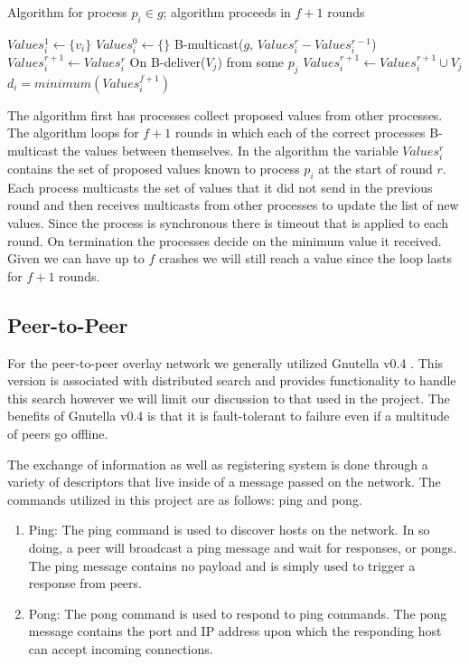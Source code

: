 \documentclass[10pt,letterpaper]{article}
\begin{document}
\begin{algorithm}
\caption{Algorithm for process $p_i \in g$; algorithm proceeds in $f+1$ rounds  }\label{alg:cap}
\begin{algorithmic}
\State $Values_i^1 \gets \{v_i\}$
\State $Values_i^0 \gets \{\}$
    \State B-multicast($g$, $Values_i^r - Values_i^{r-1}$) 
    \State $Values_i^{r+1} \gets Values_i^r$
        \State On B-deliver($V_j$) from some $p_j$
            $Values_i^{r+1} \gets Values_i^{r+1} \cup V_j$
    \EndWhile
\EndFor
\State $d_i = minimum(Values_i^{f+1})$
\end{algorithmic}
\end{algorithm}

The algorithm first has processes collect proposed values from other processes. The algorithm loops for $f+1$ rounds in which each of the correct processes B-multicast the values between themselves. In the algorithm the variable $Values_i^r$ contains the set of proposed values known to process $p_i$ at the start of round $r$. Each process multicasts the set of values that it did not send in the previous round and then receives multicasts from other processes to update the list of new values. Since the process is synchronous there is timeout that is applied to each round. On termination the processes decide on the minimum value it received. Given we can have up to $f$ crashes we will still reach a value since the loop lasts for $f+1$ rounds.


\subsection{Peer-to-Peer}\label{subsection:peer2peer}
For the peer-to-peer overlay network we generally utilized Gnutella v0.4 \cite{gnutella4}. This version is associated with distributed search and provides functionality to handle this search however we will limit our discussion to that used in the project. The benefits of Gnutella v0.4 is that it is fault-tolerant to failure even if a multitude of peers go offline.

The exchange of information as well as registering system is done through a variety of descriptors that live inside of a message passed on the network. The commands utilized in this project are as follows: ping and pong.
\begin{enumerate}
    \item [] Ping: The ping command is used to discover hosts on the network. In so doing, a peer will broadcast a ping message and wait for responses, or pongs. The ping message contains no payload and is simply used to trigger a response from peers.
    \item [] Pong: The pong command is used to respond to ping commands. The pong message contains the port and IP address upon which the responding host can accept incoming connections. 
\end{enumerate}
\end{document}
